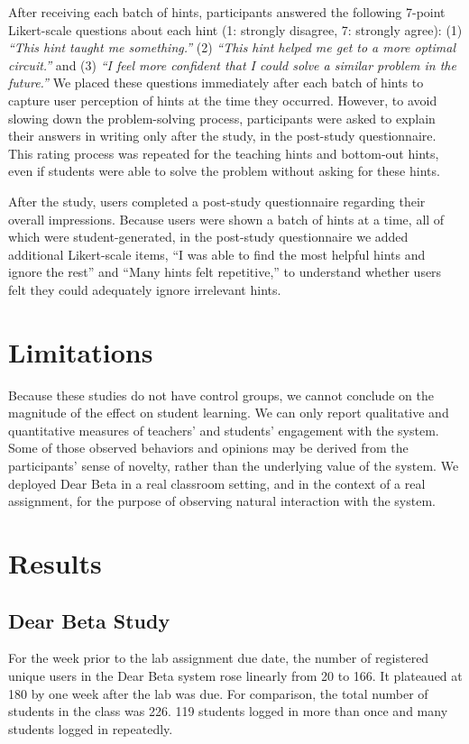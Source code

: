 After receiving each batch of hints, participants answered the following 7-point Likert-scale questions about each hint (1: strongly disagree, 7: strongly agree): (1) {\it ``This hint taught me something.''} (2) {\it ``This hint helped me get to a more optimal circuit.''} and (3) {\it ``I feel more confident that I could solve a similar problem in the future.''} We placed these questions immediately after each batch of hints to capture user perception of hints at the time they occurred. However, to avoid slowing down the problem-solving process, participants were asked to explain their answers in writing only after the study, in the post-study questionnaire. This rating process was repeated for the teaching hints and bottom-out hints, even if students were able to solve the problem without asking for these hints.

After the study, users completed a post-study questionnaire regarding their overall impressions. Because users were shown a batch of hints at a time, all of which were student-generated, in the post-study questionnaire we added additional Likert-scale items, ``I was able to find the most helpful hints and ignore the rest'' and ``Many hints felt repetitive,'' to understand whether users felt they could adequately ignore irrelevant hints. 

\section{Limitations}
Because these studies do not have control groups, we cannot conclude on the magnitude of the effect on student learning. We can only report qualitative and quantitative measures of teachers' and students' engagement with the system. Some of those observed behaviors and opinions may be derived from the participants' sense of novelty, rather than the underlying value of the system. We deployed Dear Beta in a real classroom setting, and in the context of a real assignment, for the purpose of observing natural interaction with the system. 


\section{Results}

\subsection{Dear Beta Study}

For the week prior to the lab assignment due date, the number of registered unique users in the Dear Beta system rose linearly from 20 to 166. It plateaued at 180 by one week after the lab was due. For comparison, the total number of students in the class was 226. 119 students logged in more than once and many students logged in repeatedly.

